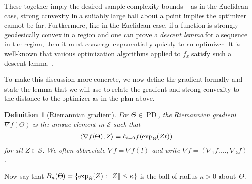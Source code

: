 \documentclass{article}
\newtheorem{definition}{Definition}
\DeclarePairedDelimiter{\norm}{\lVert}{\rVert}
\newcommand\PD{\operatorname{PD}}
\newcommand\Sym{\mathcal{S}}
\newcommand\samp{x}
\begin{document}
These together imply the desired sample complexity bounds -- as in the Euclidean case, strong convexity in a suitably large ball about a point implies the optimizer cannot be far.
Furthermore, like in the Euclidean case, if a function is strongly geodesically convex in a region and one can prove a \emph{descent lemma} for a sequence in the region, then it must converge exponentially quickly to an optimizer.
It is well-known that various optimization algorithms applied to $f_{\samp}$ satisfy such a descent lemma~\cite{burgisser2019towards}.

To make this discussion more concrete, we now define the gradient formally and state the lemma that we will use to relate the gradient and strong convexity to the distance to the optimizer as in the plan above.

\begin{definition}[Riemannian gradient]
For $\Theta \in \PD$, the \emph{Riemannian gradient}~$\nabla f(\Theta)$ is the unique element in $\Sym$ such that
\begin{align*}
  \braket{\nabla f(\Theta), Z} = \partial_{t=0} f(\exp_{\Theta}(Zt))
\end{align*}
for all $Z\in \Sym$.
We often abbreviate $\nabla f = \nabla f(I)$ and write $\nabla f = (\nabla_1 f, \dots, \nabla_k f)$.
\end{definition}

\noindent
Now say that $B_\kappa(\Theta) = \{ \exp_{\Theta}(Z) : \norm Z \leq \kappa \}$ is the ball of radius $\kappa>0$ about~$\Theta$.
\end{document}
